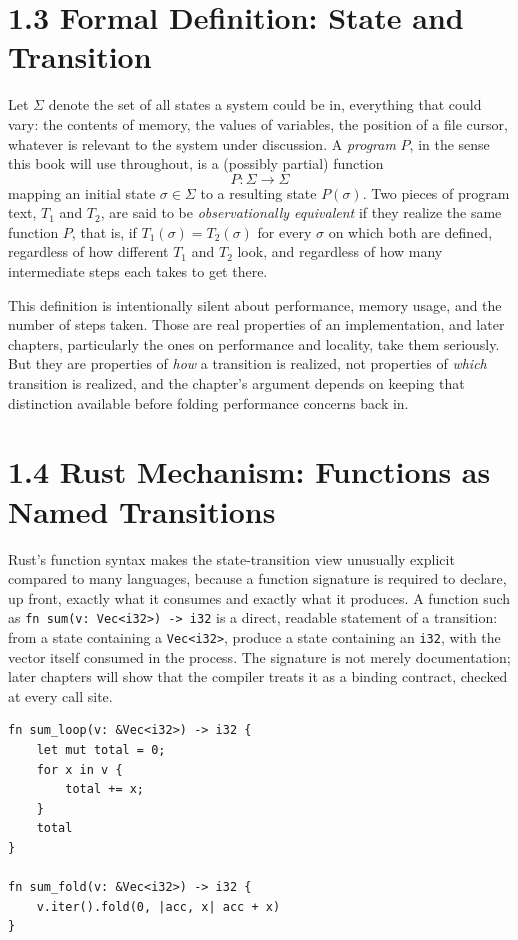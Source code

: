 \documentclass[11pt]{book}
\begin{document}
\section*{1.3 Formal Definition: State and Transition}

Let $\Sigma$ denote the set of all states a system could be in, everything that could vary: the contents of memory, the values of variables, the position of a file cursor, whatever is relevant to the system under discussion. A \emph{program} $P$, in the sense this book will use throughout, is a (possibly partial) function
\[
P : \Sigma \rightarrow \Sigma
\]
mapping an initial state $\sigma \in \Sigma$ to a resulting state $P(\sigma)$. Two pieces of program text, $T_1$ and $T_2$, are said to be \emph{observationally equivalent} if they realize the same function $P$, that is, if $T_1(\sigma) = T_2(\sigma)$ for every $\sigma$ on which both are defined, regardless of how different $T_1$ and $T_2$ look, and regardless of how many intermediate steps each takes to get there.

This definition is intentionally silent about performance, memory usage, and the number of steps taken. Those are real properties of an implementation, and later chapters, particularly the ones on performance and locality, take them seriously. But they are properties of \emph{how} a transition is realized, not properties of \emph{which} transition is realized, and the chapter's argument depends on keeping that distinction available before folding performance concerns back in.

\section*{1.4 Rust Mechanism: Functions as Named Transitions}

Rust's function syntax makes the state-transition view unusually explicit compared to many languages, because a function signature is required to declare, up front, exactly what it consumes and exactly what it produces. A function such as \texttt{fn sum(v: Vec<i32>) -> i32} is a direct, readable statement of a transition: from a state containing a \texttt{Vec<i32>}, produce a state containing an \texttt{i32}, with the vector itself consumed in the process. The signature is not merely documentation; later chapters will show that the compiler treats it as a binding contract, checked at every call site.

\begin{lstlisting}
fn sum_loop(v: &Vec<i32>) -> i32 {
    let mut total = 0;
    for x in v {
        total += x;
    }
    total
}

fn sum_fold(v: &Vec<i32>) -> i32 {
    v.iter().fold(0, |acc, x| acc + x)
}
\end{lstlisting}
\end{document}
